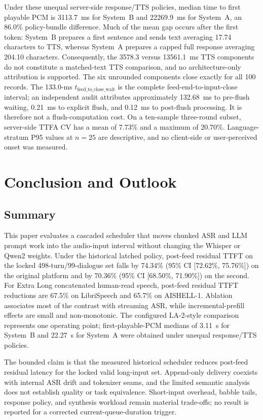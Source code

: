 \documentclass[conference]{IEEEtran}
\begin{document}
Under these unequal server-side response/TTS policies, median time to first playable PCM is 3113.7~ms for System~B and 22269.9~ms for System~A, an 86.0\% policy-bundle difference. Much of the mean gap occurs after the first token: System~B prepares a first sentence and sends text averaging 17.74 characters to TTS, whereas System~A prepares a capped full response averaging 204.10 characters. Consequently, the 3578.3 versus 13561.1~ms TTS components do not constitute a matched-text TTS comparison, and no architecture-only attribution is supported. The six unrounded components close exactly for all 100 records. The 133.0-ms $t_{\mathrm{feed\_to\_close\_wait}}$ is the complete feed-end-to-input-close interval; an independent audit attributes approximately 132.68~ms to pre-flush waiting, 0.21~ms to explicit flush, and 0.12~ms to post-flush processing. It is therefore not a flush-computation cost. On a ten-sample three-round subset, server-side TTFA CV has a mean of 7.73\% and a maximum of 20.70\%. Language-stratum P95 values at $n=25$ are descriptive, and no client-side or user-perceived onset was measured.

\section{Conclusion and Outlook}\label{sec:conclusion}

\subsection{Summary}

This paper evaluates a cascaded scheduler that moves chunked ASR and LLM prompt work into the audio-input interval without changing the Whisper or Qwen2 weights. Under the historical latched policy, post-feed residual TTFT on the locked 498-turn/99-dialogue set falls by 74.34\% (95\% CI [72.62\%, 75.76\%]) on the original platform and by 70.36\% (95\% CI [68.50\%, 71.90\%]) on the second. For Extra Long concatenated human-read speech, post-feed residual TTFT reductions are 67.5\% on LibriSpeech and 65.7\% on AISHELL-1. Ablation associates most of the contrast with streaming ASR, while incremental-prefill effects are small and non-monotonic. The configured LA-2-style comparison represents one operating point; first-playable-PCM medians of 3.11~s for System~B and 22.27~s for System~A were obtained under unequal response/TTS policies.

The bounded claim is that the measured historical scheduler reduces post-feed residual latency for the locked valid long-input set. Append-only delivery coexists with internal ASR drift and tokenizer seams, and the limited semantic analysis does not establish quality or task equivalence. Short-input overhead, babble tails, response policy, and synthesis workload remain material trade-offs; no result is reported for a corrected current-queue-duration trigger.
\end{document}
